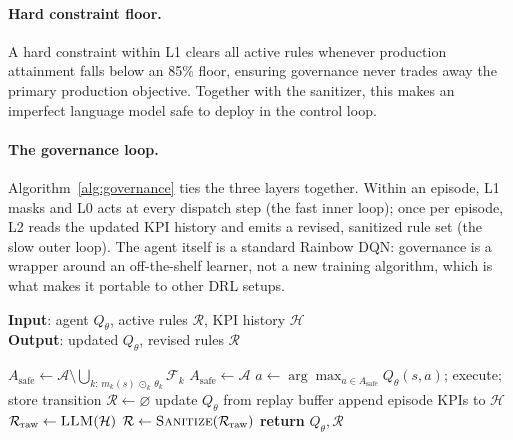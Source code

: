 \documentclass[letterpaper]{article} %
\begin{document}
\paragraph{Hard constraint floor.}
A hard constraint within L1 clears all active rules whenever production
attainment falls below an 85\% floor, ensuring governance never trades away the
primary production objective. Together with the sanitizer, this makes an
imperfect language model safe to deploy in the control loop.

\paragraph{The governance loop.}
Algorithm~\ref{alg:governance} ties the three layers together. Within an episode,
L1 masks and L0 acts at every dispatch step (the fast inner loop); once per
episode, L2 reads the updated KPI history and emits a revised, sanitized rule set
(the slow outer loop). The agent itself is a standard Rainbow DQN: governance is a
wrapper around an off-the-shelf learner, not a new training algorithm, which is
what makes it portable to other DRL setups.

\begin{algorithm}[t]
\caption{LLM-governed training episode}
\label{alg:governance}
\textbf{Input}: agent $Q_\theta$, active rules $\mathcal{R}$, KPI history $\mathcal{H}$\\
\textbf{Output}: updated $Q_\theta$, revised rules $\mathcal{R}$
\begin{algorithmic}[1]
  \STATE $A_{\text{safe}} \gets \mathcal{A}\setminus\bigcup_{k:\,m_k(s)\,\odot_k\,\theta_k}\mathcal{F}_k$ 
     \STATE $A_{\text{safe}}\gets\mathcal{A}$ 
  \ENDIF
  \STATE $a\gets\arg\max_{a\in A_{\text{safe}}}Q_\theta(s,a)$; execute; store transition
     \STATE $\mathcal{R}\gets\varnothing$ 
  \ENDIF
  \STATE update $Q_\theta$ from replay buffer
\ENDFOR
\STATE append episode KPIs to $\mathcal{H}$
\STATE $\mathcal{R}_{\text{raw}}\gets\textsc{LLM}(\mathcal{H})$ 
\STATE $\mathcal{R}\gets\textsc{Sanitize}(\mathcal{R}_{\text{raw}})$ 
\STATE \textbf{return} $Q_\theta,\mathcal{R}$
\end{algorithmic}
\end{algorithm}
\end{document}
